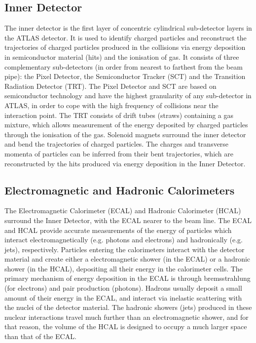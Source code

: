 

\subsection{Inner Detector}
The inner detector is the first layer of concentric cylindrical sub-detector layers in the ATLAS detector. It is used to identify charged particles and reconstruct the trajectories of charged particles produced in the collisions via energy deposition in semiconductor material (hits) and the ionisation of gas. It consists of three complementary sub-detectors (in order from nearest to farthest from the beam pipe): the Pixel Detector, the Semiconductor Tracker (SCT) and the Transition Radiation Detector (TRT). The Pixel Detector and SCT are based on semiconductor technology and have the highest granularity of any sub-detector in ATLAS, in order to cope with the high frequency of collisions near the interaction point. The TRT consists of drift tubes (straws) containing a gas mixture, which allows measurement of the energy deposited by charged particles through the ionisation of the gas. Solenoid magnets surround the inner detector and bend the trajectories of charged particles. The charges and transverse momenta of particles can be inferred from their bent trajectories, which are reconstructed by the hits produced via energy deposition in the Inner Detector.

\subsection{Electromagnetic and Hadronic Calorimeters}
The Electromagnetic Calorimeter (ECAL) and Hadronic Calorimeter (HCAL) surround the Inner Detector, with the ECAL nearer to the beam line. The ECAL and HCAL provide accurate measurements of the energy of particles which interact electromagnetically (e.g. photons and electrons) and hadronically (e.g. jets), respectively. Particles entering the calorimeters interact with the detector material and create either a electromagnetic shower (in the ECAL) or a hadronic shower (in the HCAL), depositing all their energy in the calorimeter cells. The primary mechanism of energy deposition in the ECAL is through bremsstrahlung (for electrons) and pair production (photons). Hadrons usually deposit a small amount of their energy in the ECAL, and interact via inelastic scattering with the nuclei of the detector material. The hadronic showers (jets) produced in these nuclear interactions travel much further than an electromagnetic shower, and for that reason, the volume of the HCAL is designed to occupy a much larger space than that of the ECAL.

